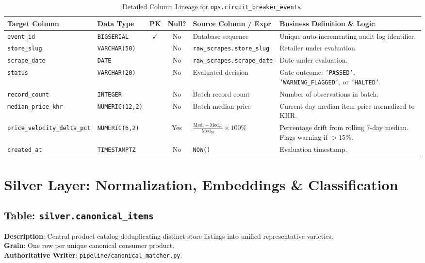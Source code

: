 \documentclass[a4paper, 11pt]{article}
\begin{document}
\begin{table}[H]
\centering
\small
\begin{tabularx}{\textwidth}{l p{2.5cm} c c p{4.0cm} X}
\toprule
\textbf{Target Column} & \textbf{Data Type} & \textbf{PK} & \textbf{Null?} & \textbf{Source Column / Expr} & \textbf{Business Definition \& Logic} \\
\midrule
\texttt{event\_id} & \texttt{BIGSERIAL} & $\checkmark$ & No & Database sequence & Unique auto-incrementing audit log identifier. \\
\texttt{store\_slug} & \texttt{VARCHAR(50)} & & No & \texttt{raw\_scrapes.store\_slug} & Retailer under evaluation. \\
\texttt{scrape\_date} & \texttt{DATE} & & No & \texttt{raw\_scrapes.scrape\_date} & Date under evaluation. \\
\texttt{status} & \texttt{VARCHAR(20)} & & No & Evaluated decision & Gate outcome: \texttt{'PASSED'}, \texttt{'WARNING\_FLAGGED'}, or \texttt{'HALTED'}. \\
\texttt{record\_count} & \texttt{INTEGER} & & No & Batch record count & Number of observations in batch. \\
\texttt{median\_price\_khr} & \texttt{NUMERIC(12,2)} & & No & Batch median price & Current day median item price normalized to KHR. \\
\texttt{price\_velocity\_delta\_pct} & \texttt{NUMERIC(6,2)} & & Yes & $\frac{\text{Med}_t - \text{Med}_{7d}}{\text{Med}_{7d}} \times 100\%$ & Percentage drift from rolling 7-day median. Flags warning if $>15\%$. \\
\texttt{created\_at} & \texttt{TIMESTAMPTZ} & & No & \texttt{NOW()} & Evaluation timestamp. \\
\bottomrule
\end{tabularx}
\caption{Detailed Column Lineage for \texttt{ops.circuit\_breaker\_events}.}
\end{table}

\newpage
\section{Silver Layer: Normalization, Embeddings \& Classification}

\subsection{Table: \texttt{silver.canonical\_items}}
\textbf{Description}: Central product catalog deduplicating distinct store listings into unified representative varieties. \\
\textbf{Grain}: One row per unique canonical consumer product. \\
\textbf{Authoritative Writer}: \texttt{pipeline/canonical\_matcher.py}.
\end{document}
